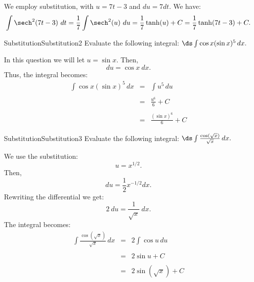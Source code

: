 \begin{solution} 
 We employ substitution, with $u = 7t-3$ and $du = 7dt$. We have:
$$ \int \sech^2 (7t-3)\ dt=  \frac17 \int \sech^2 (u)\ du= \frac17\tanh (u) + C = \frac17\tanh (7t-3) + C.$$
\end{solution}





\begin{example}{Substitution}{Substitution2}
Evaluate the following integral: $\ds\int \cos x(\sin x)^5\,dx.$
\end{example}

\begin{solution} 
In this question we will let $u=\sin x$.
Then,
$$du=\cos x~dx.$$
Thus, the integral becomes:
\begin{eqnarray*}
\int \cos x(\sin x)^5\,dx&=&\int u^5\,du\\
\\
&=&\frac{u^6}{6}+C\\
\\
&=&\frac{(\sin x)^6}{6}+C
\end{eqnarray*}
\end{solution}

\begin{example}{Substitution}{Substitution3}
Evaluate the following integral:
$\ds\int \frac{\cos(\sqrt x)}{\sqrt x}\,dx.$
\end{example}

\begin{solution} 
We use the substitution:
$$u=x^{1/2}.$$
Then,
$$du=\frac{1}{2}x^{-1/2}dx.$$
Rewriting the differential we get:
$$2~du=\frac{1}{\sqrt x}~dx.$$
The integral becomes:
\begin{eqnarray*}
\int \frac{\cos(\sqrt x)}{\sqrt x}\,dx&=&2\int \cos u\,du\\
\\
&=&2\sin u+C\\
\\
&=&2\sin(\sqrt x)+C
\end{eqnarray*}
\end{solution}




